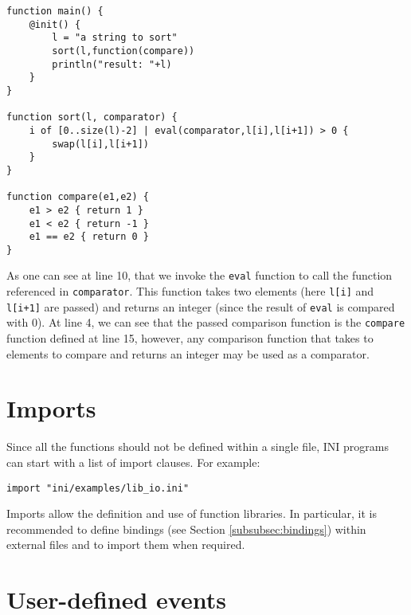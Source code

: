 \documentclass[11pt]{report}
\begin{document}
{ \small
\begin{lstlisting}
function main() {
	@init() {
		l = "a string to sort"
		sort(l,function(compare))
		println("result: "+l)
	}
}

function sort(l, comparator) {
	i of [0..size(l)-2] | eval(comparator,l[i],l[i+1]) > 0 {
		swap(l[i],l[i+1])
	}
}

function compare(e1,e2) {
	e1 > e2 { return 1 }
	e1 < e2 { return -1 }
	e1 == e2 { return 0 }
}
\end{lstlisting} }

As one can see at line 10, that we invoke the \texttt{eval} function to call the function referenced in \texttt{comparator}. This function takes two elements (here \texttt{l[i]} and \texttt{l[i+1]} are passed) and returns an integer (since the result of \texttt{eval} is compared with 0). At line 4, we can see that the passed comparison function is the \texttt{compare} function defined at line 15, however, any comparison function that takes to elements to compare and returns an integer may be used as a comparator.

\section{Imports\label{sec:imports}}

Since all the functions should not be defined within a single file, INI programs can start with a list of import clauses. For example:

\begin{lstlisting}[numbers=none]
import "ini/examples/lib_io.ini"
\end{lstlisting}

Imports allow the definition and use of function libraries. In particular, it is recommended to define bindings (see Section \ref{subsubsec:bindings}) within external files and to import them when required.

\section{User-defined events}
\end{document}
